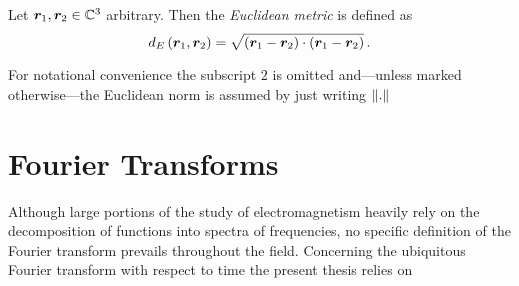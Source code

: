 \begin{definition}\label{def:euclidean_metric}
	Let $\pvec{r}_1, \pvec{r}_2 \in \C^3$ arbitrary. Then the \emph{Euclidean
	metric} is defined as
	\begin{equation}
		d_E\left(\pvec{r}_1 , \pvec{r}_2\right) = 
		\sqrt{
			\left(\pvec{r}_1 - \pvec{r}_2\right)
			\cdot
			\left(\pvec{r}_1 - \pvec{r}_2\right)
		} \, .
	\end{equation}
\end{definition}

\begin{remark}
	For notational convenience the subscript $2$ is omitted and---unless
	marked otherwise---the Euclidean norm is assumed by just writing $\left\Vert . \right\Vert$
\end{remark}








\section{Fourier Transforms}
\label{sec:fourier_transforms}

Although large portions of the study of electromagnetism heavily rely on the
decomposition of functions into spectra of frequencies, no specific definition
of the Fourier transform prevails throughout the field.
Concerning the ubiquitous Fourier transform with respect to time the present
thesis relies on

